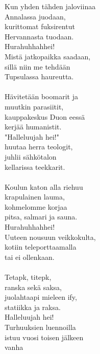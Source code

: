 
Kun yhden tähden jaloviinaa \\ Annalassa juodaan, \\ kurittomat fuksirentut \\ Hervannasta tuodaan. \\ Hurahuhhahhei! \\ Mistä jatkopaikka saadaan, \\ sillä niin me tehdään  \\ Tupsulassa haureutta. \\ \hspace{10mm} \\ Hävitetään boomarit ja \\ muutkin parasiitit, \\ kauppakeskus Duon eessä \\ kerjää humanistit. \\ "Halleluujah hei!" \\ huutaa herra teologit, \\ juhlii sähkötalon \\ kellarissa teekkarit. \\ \hspace{10mm} \\ Koulun katon alla riehuu \\ krapulainen lauma, \\ kohmelomme korjaa \\ pitsa, salmari ja sauna. \\ Hurahuhhahhei! \\ Uuteen nousuun veikkokulta, \\ kotiin teleporttaamalla \\ tai ei ollenkaan. \\ \hspace{10mm} \\ Tetapk, titepk, \\ ranska sekä saksa, \\ juolahtaapi mieleen ify, \\ statiikka ja raksa. \\ Halleluujah hei! \\ Turhuuksien luennoilla \\ istuu vuosi toisen jälkeen \\ vanha 